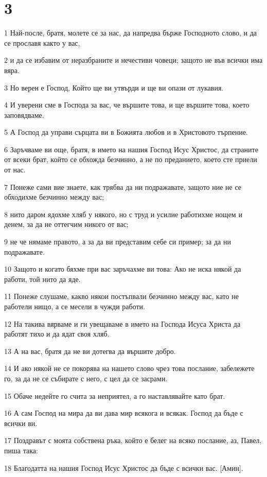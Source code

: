\chapter{3}

\par 1 Най-после, братя, молете се за нас, да напредва бърже Господното слово, и да се прославя както у вас,
\par 2 и да се избавим от неразбраните и нечестиви човеци; защото не във всички има вяра.
\par 3 Но верен е Господ, Който ще ви утвърди и ще ви опази от лукавия.
\par 4 И уверени сме в Господа за вас, че вършите това, и ще вършите това, което заповядваме.
\par 5 А Господ да управи сърцата ви в Божията любов и в Христовото търпение.
\par 6 Заръчваме ви още, братя, в името на нашия Господ Исус Христос, да страните от всеки брат, който се обхожда безчинно, а не по преданието, което сте приели от нас.
\par 7 Понеже сами вие знаете, как трябва да ни подражавате, защото ние не се обходихме безчинно между вас;
\par 8 нито даром ядохме хляб у някого, но с труд и усилие работихме нощем и денем, за да не оттегчим никого от вас;
\par 9 не че нямаме правото, а за да ви представим себе си пример; за да ни подражавате.
\par 10 Защото и когато бяхме при вас заръчахме ви това: Ако не иска някой да работи, той нито да яде.
\par 11 Понеже слушаме, какво някои постъпвали безчинно между вас, като не работели нищо, а се месели в чужди работи.
\par 12 На такива вярваме и ги увещаваме в името на Господа Исуса Христа да работят тихо и да ядат своя хляб.
\par 13 А на вас, братя да не ви дотегва да вършите добро.
\par 14 И ако някой не се покорява на нашето слово чрез това послание, забележете го, за да не се събирате с него, с цел да се засрами.
\par 15 Обаче недейте го счита за неприятел, а го наставлявайте като брат.
\par 16 А сам Господ на мира да ви дава мир всякога и всякак. Господ да бъде с всички ви.
\par 17 Поздравът с моята собствена ръка, който е белег на всяко послание, аз, Павел, пиша така:
\par 18 Благодатта на нашия Господ Исус Христос да бъде с всички вас. [Амин].

